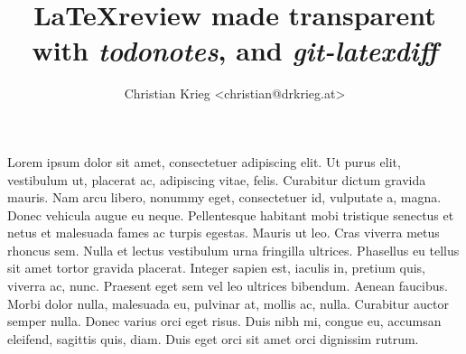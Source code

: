 \documentclass[%
	a4paper,%
	twoside%
] {article}
\title{\LaTeX review made transparent with \emph{todonotes}, and \emph{git-latexdiff}}
\author{Christian Krieg <christian@drkrieg.at>}
\begin{document}
\maketitle

Lorem ipsum dolor sit amet, consectetuer adipiscing elit. Ut purus elit,
vestibulum ut, placerat ac, adipiscing vitae, felis.  Curabitur dictum gravida
mauris. Nam arcu libero, nonummy eget, consectetuer id, vulputate a, magna.
Donec vehicula augue eu neque. Pellentesque habitant mobi tristique senectus et
netus et malesuada fames ac turpis egestas. Mauris ut leo. Cras viverra metus
rhoncus sem. Nulla et lectus vestibulum urna fringilla ultrices. Phasellus eu
tellus sit amet tortor gravida placerat. Integer sapien est, iaculis in,
pretium quis, viverra ac, nunc.  Praesent eget sem vel leo ultrices bibendum.
Aenean faucibus. Morbi dolor nulla, malesuada eu, pulvinar at, mollis ac,
nulla.  Curabitur auctor semper nulla.  Donec varius orci eget risus. Duis nibh
mi, congue eu, accumsan eleifend, sagittis quis, diam. Duis eget orci sit amet
orci dignissim rutrum.
\end{document}
